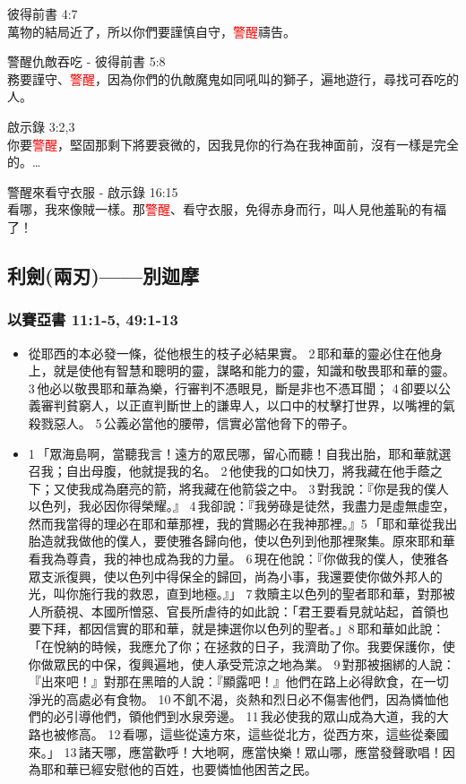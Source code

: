 彼得前書 4:7\\
萬物的結局近了，所以你們要謹慎自守，\textcolor{red}{警醒}禱告。

警醒仇敵吞吃 - 彼得前書 5:8\\
務要謹守、\textcolor{red}{警醒}，因為你們的仇敵魔鬼如同吼叫的獅子，遍地遊行，尋找可吞吃的人。

啟示錄 3:2,3\\
你要\textcolor{red}{警醒}，堅固那剩下將要衰微的，因我見你的行為在我神面前，沒有一樣是完全的。…

警醒來看守衣服 - 啟示錄 16:15\\
看哪，我來像賊一樣。那\textcolor{red}{警醒}、看守衣服，免得赤身而行，叫人見他羞恥的有福了！








\subsection{利劍(兩刃)——別迦摩}

\subsubsection{以賽亞書 11:1-5, 49:1-13}
\begin{itemize} 
\itemsep-.25em
\item 從耶西的本必發一條，從他根生的枝子必結果實。 2 耶和華的靈必住在他身上，就是使他有智慧和聰明的靈，謀略和能力的靈，知識和敬畏耶和華的靈。 3 他必以敬畏耶和華為樂，行審判不憑眼見，斷是非也不憑耳聞； 4 卻要以公義審判貧窮人，以正直判斷世上的謙卑人，以口中的杖擊打世界，以嘴裡的氣殺戮惡人。 5 公義必當他的腰帶，信實必當他脅下的帶子。
\item 1 「眾海島啊，當聽我言！遠方的眾民哪，留心而聽！自我出胎，耶和華就選召我；自出母腹，他就提我的名。 2 他使我的口如快刀，將我藏在他手蔭之下；又使我成為磨亮的箭，將我藏在他箭袋之中。 3 對我說：『你是我的僕人以色列，我必因你得榮耀。』 4 我卻說：『我勞碌是徒然，我盡力是虛無虛空，然而我當得的理必在耶和華那裡，我的賞賜必在我神那裡。』5 「耶和華從我出胎造就我做他的僕人，要使雅各歸向他，使以色列到他那裡聚集。原來耶和華看我為尊貴，我的神也成為我的力量。 6 現在他說：『你做我的僕人，使雅各眾支派復興，使以色列中得保全的歸回，尚為小事，我還要使你做外邦人的光，叫你施行我的救恩，直到地極。』」 7 救贖主以色列的聖者耶和華，對那被人所藐視、本國所憎惡、官長所虐待的如此說：「君王要看見就站起，首領也要下拜，都因信實的耶和華，就是揀選你以色列的聖者。」8 耶和華如此說：「在悅納的時候，我應允了你；在拯救的日子，我濟助了你。我要保護你，使你做眾民的中保，復興遍地，使人承受荒涼之地為業。 9 對那被捆綁的人說：『出來吧！』對那在黑暗的人說：『顯露吧！』他們在路上必得飲食，在一切淨光的高處必有食物。 10 不飢不渴，炎熱和烈日必不傷害他們，因為憐恤他們的必引導他們，領他們到水泉旁邊。 11 我必使我的眾山成為大道，我的大路也被修高。 12 看哪，這些從遠方來，這些從北方，從西方來，這些從秦國來。」 13 諸天哪，應當歡呼！大地啊，應當快樂！眾山哪，應當發聲歌唱！因為耶和華已經安慰他的百姓，也要憐恤他困苦之民。
\end{itemize}

